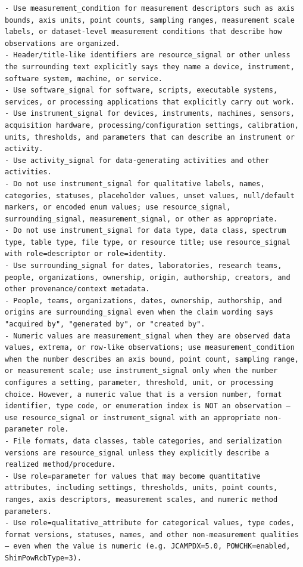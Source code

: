 \begin{lstlisting}[style=workflowPromptListing]
- Use measurement_condition for measurement descriptors such as axis bounds, axis units, point counts, sampling ranges, measurement scale labels, or dataset-level measurement conditions that describe how observations are organized.
- Header/title-like identifiers are resource_signal or other unless the surrounding text explicitly says they name a device, instrument, software system, machine, or service.
- Use software_signal for software, scripts, executable systems, services, or processing applications that explicitly carry out work.
- Use instrument_signal for devices, instruments, machines, sensors, acquisition hardware, processing/configuration settings, calibration, units, thresholds, and parameters that can describe an instrument or activity.
- Use activity_signal for data-generating activities and other activities.
- Do not use instrument_signal for qualitative labels, names, categories, statuses, placeholder values, unset values, null/default markers, or encoded enum values; use resource_signal, surrounding_signal, measurement_signal, or other as appropriate.
- Do not use instrument_signal for data type, data class, spectrum type, table type, file type, or resource title; use resource_signal with role=descriptor or role=identity.
- Use surrounding_signal for dates, laboratories, research teams, people, organizations, ownership, origin, authorship, creators, and other provenance/context metadata.
- People, teams, organizations, dates, ownership, authorship, and origins are surrounding_signal even when the claim wording says "acquired by", "generated by", or "created by".
- Numeric values are measurement_signal when they are observed data values, extrema, or row-like observations; use measurement_condition when the number describes an axis bound, point count, sampling range, or measurement scale; use instrument_signal only when the number configures a setting, parameter, threshold, unit, or processing choice. However, a numeric value that is a version number, format identifier, type code, or enumeration index is NOT an observation — use resource_signal or instrument_signal with an appropriate non-parameter role.
- File formats, data classes, table categories, and serialization versions are resource_signal unless they explicitly describe a realized method/procedure.
- Use role=parameter for values that may become quantitative attributes, including settings, thresholds, units, point counts, ranges, axis descriptors, measurement scales, and numeric method parameters.
- Use role=qualitative_attribute for categorical values, type codes, format versions, statuses, names, and other non-measurement qualities — even when the value is numeric (e.g. JCAMPDX=5.0, POWCHK=enabled, ShimPowRcbType=3).

\end{lstlisting}
